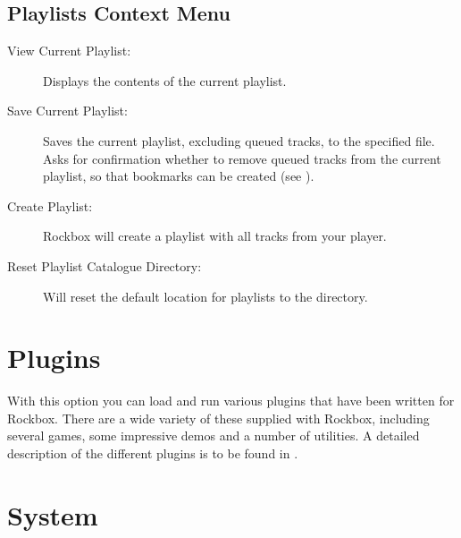 \subsection{\label{ref:playlistcatalogue_contextmenu}Playlists Context Menu}

\begin{description}
\item[View Current Playlist:]
  Displays the contents of the current playlist.

\item[Save Current Playlist:]
  Saves the current playlist, excluding queued tracks, to the
specified file. Asks for confirmation whether to remove queued tracks
from the current playlist, so that bookmarks can be created
(see ).

\item[Create Playlist:]
  Rockbox will create a playlist with all tracks from your player.

\item[Reset Playlist Catalogue Directory:]
  Will reset the default location for playlists to the 
directory.

\end{description}

\section{Plugins}
  With this option you can load and run various plugins that have been
written for Rockbox. There are a wide variety of these supplied with
Rockbox, including several games, some impressive demos and a number of
utilities. A detailed description of the different plugins is to be found in
.

\section{\label{ref:Info}System}

